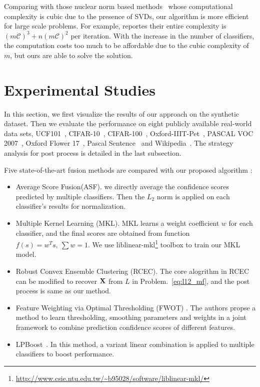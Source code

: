 \documentclass[10pt,twocolumn,letterpaper]{article}
\def\calC{{\mathcal{C}}}
\def\bX{{\bf X}}
\def\bX{{\bf X}}
\begin{document}
Comparing with those nuclear norm based methods~\cite{gaoijcai2016robust,ye2012robust} whose computational complexity is cubic due to the presence of SVDs,
our algorithm is more efficient for large scale problems.
For example, \cite{gaoijcai2016robust} reportes their entire complexity is $(m{\calC})^3+n(m{\calC})^2$ per iteration.
With the increase in the number of classifiers,
the computation costs too much to be affordable due to the cubic complexity of $m$,
but ours are able to solve the solution.

\section{Experimental Studies}

In this section, we first visualize the results of our approach on the synthetic dataset.
Then we evaluate the performance on eight publicly available real-world data sets,
UCF101~\cite{soomro2012ucf101}, CIFAR-10~\cite{krizhevsky2009learning}, CIFAR-100~\cite{krizhevsky2009learning}, Oxford-IIIT-Pet~\cite{parkhi2012cats}, PASCAL VOC 2007~\cite{pascal-voc-2007}, Oxford Flower 17~\cite{nilsback2006visual}, Pascal Sentence~\cite{rashtchian2010collecting} and Wikipedia~\cite{rasiwasia2010new}.
The strategy analysis for post process is detailed in the last subsection.


Five state-of-the-art fusion methods are compared with our proposed algorithm :
\begin{itemize}
\item Average Score Fusion(ASF). we directly average the confidence scores predicted by multiple classifiers. 
Then the $L_2$ norm is applied on each classifier's results for normalization.
\item Multiple Kernel Learning (MKL).  MKL learns a weight coefficient $w$ for each classifier, and the final scores are obtained from function $f(s)=w^{T}s,~\sum w = 1$. We use liblinear-mkl\footnote{\url{http://www.csie.ntu.edu.tw/~b95028/software/liblinear-mkl/}} toolbox to train our MKL model.
\item Robust Convex Ensemble Clustering (RCEC)\cite{gaoijcai2016robust}.
The core alogrithm in RCEC can be modified to recover $\bX$ from $L$ in Problem.~\ref{eq:l12_mf}, and the post process is same as our method.
\item Feature Weighting via Optimal Thresholding (FWOT) \cite{xuiccv2013feature}.
The authors propse a method to learn thresholding, smoothing parameters and weights in a joint framework to combine prediction confidence scores of different features.
\item LPBoost~\cite{gehler2009feature}. In this method, a variant linear combination is applied to multiple classifiers to boost performance.
\end{itemize}
\end{document}
